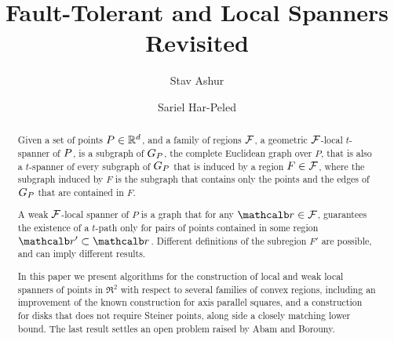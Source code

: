 \documentclass[12pt]{article}%
\begin{document}
\title{Fault-Tolerant and Local Spanners Revisited}
	
\author{%
   Stav Ashur%
   \StavThanks{}%
   \and%
   Sariel Har-Peled%
}%
	
\maketitle



\begin{abstract}
	
	Given a set of points $P\in \mathbb{R}^d $, and a family of regions $\mathcal{F}$,
	a geometric $\mathcal{F}$-local $t$-spanner of $P$, is a
	subgraph of $G_P$, the complete Euclidean graph over $P$, that is
	also a $t$-spanner of every subgraph of $G_P$ that is induced by a
	region $F\in \mathcal{F}$, where the subgraph induced by $F$ is the subgraph
	that contains only the points and the edges of $G_P$ that are
	contained in $F$.
	
	
	A weak $\mathcal{F}$-local spanner of $P$ is a graph that
	for any $\region\in\FF$, guarantees the existence of a $t$-path only for
	pairs of points contained in some region $\region'\subset \region$. Different definitions of the subregion $F'$ are possible, and can imply different results.  
	
	In this paper we present algorithms for the construction of local
	and weak local spanners of points in $\Re^2$ with respect to
	several families of	convex regions, including an improvement of the
	known construction for axis parallel squares, and a construction for
	disks that does not require Steiner points, along side a closely
	matching lower bound. The last result settles an open problem raised
	by Abam and Borouny. 
\end{abstract}
\end{document}
